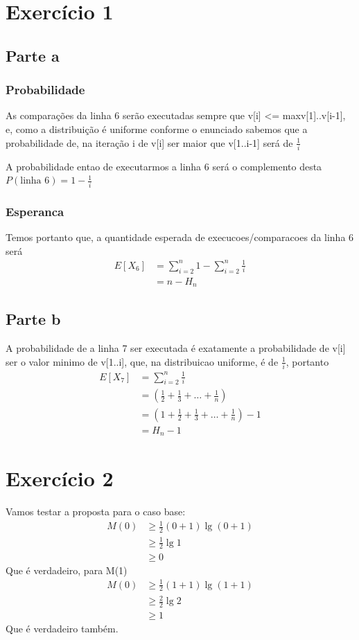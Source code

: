 \documentclass[a4paper,12pt]{article}
\begin{document}
\section*{Exercício 1}
\subsection*{Parte a}
\subsubsection*{Probabilidade}
As comparações da linha 6 serão executadas sempre que v[i] <= max{v[1]..v[i-1]}, e, como a distribuição é uniforme conforme o enunciado sabemos que a probabilidade de, na iteração i de v[i] ser maior que v[1..i-1] será de $\frac{1}{i}$

A probabilidade entao de executarmos a linha 6 será o complemento desta $P(\text{linha 6}) = 1 - \frac{1}{i}$
\subsubsection*{Esperanca}
Temos portanto que, a quantidade esperada de execucoes/comparacoes da linha 6 será
\begin{align}
    E[X_6]
    &= \sum_{i=2}^n 1 - \sum_{i=2}^n \frac{1}{i} \\
    &= n - H_n
\end{align}

\subsection*{Parte b}
A probabilidade de a linha 7 ser executada é exatamente a probabilidade de v[i] ser o valor minimo de v[1..i], que, na distribuicao uniforme, é de $\frac{1}{i}$, portanto
\begin{align}
    E[X_7]
    &= \sum_{i=2}^n \frac{1}{i} \\
    &= (\frac{1}{2} + \frac{1}{3} + \dots + \frac{1}{n}) \\
    &= (1 + \frac{1}{2} + \frac{1}{3} + \dots + \frac{1}{n}) - 1 \\
    &= H_n - 1
\end{align}
\section*{Exercício 2}
Vamos testar a proposta para o caso base:
\begin{align}
    M(0)
    &\geq \frac{1}{2}(0 + 1)\lg{(0 + 1)} \\
    &\geq \frac{1}{2}\lg{1} \\
    &\geq 0
\end{align}
Que é verdadeiro, para M(1)
\begin{align}
    M(0)
    &\geq \frac{1}{2}(1 + 1)\lg{(1 + 1)} \\
    &\geq \frac{2}{2}\lg{2} \\
    &\geq 1
\end{align}
Que é verdadeiro também.
\end{document}
